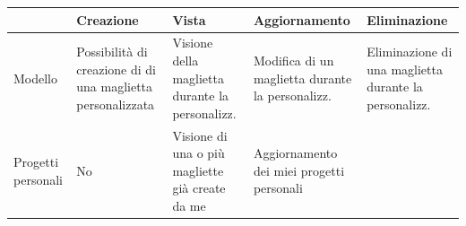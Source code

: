 \documentclass[12pt,italian,]{report}
\begin{document}
\begin{longtable}[]{|l|l|l|l|l|}
\toprule
\begin{minipage}[b]{0.17\columnwidth}\raggedright
\strut
\end{minipage} & \begin{minipage}[c]{0.17\columnwidth}\raggedright
Creazione\strut
\end{minipage} & \begin{minipage}[c]{0.17\columnwidth}\raggedright
Vista\strut
\end{minipage} & \begin{minipage}[c]{0.27\columnwidth}\raggedright
Aggiornamento\strut
\end{minipage} & \begin{minipage}[c]{0.17\columnwidth}\raggedright
Eliminazione\strut
\end{minipage}\tabularnewline
\midrule
\endhead
\begin{minipage}[t]{0.17\columnwidth}\raggedright
Modello\strut
\end{minipage} & \begin{minipage}[t]{0.17\columnwidth}\raggedright
Possibilità di creazione di di una maglietta personalizzata\strut
\end{minipage} & \begin{minipage}[t]{0.17\columnwidth}\raggedright
Visione della maglietta durante la personalizz.\strut
\end{minipage} & \begin{minipage}[t]{0.17\columnwidth}\raggedright
Modifica di un maglietta durante la personalizz.\strut
\end{minipage} & \begin{minipage}[t]{0.17\columnwidth}\raggedright
Eliminazione di una maglietta durante la personalizz.\strut
\end{minipage}\tabularnewline
\begin{minipage}[t]{0.17\columnwidth}\raggedright
Progetti personali\strut
\end{minipage} & \begin{minipage}[t]{0.17\columnwidth}\raggedright
No\strut
\end{minipage} & \begin{minipage}[t]{0.17\columnwidth}\raggedright
Visione di una o più magliette già create da me\strut
\end{minipage} & \begin{minipage}[t]{0.17\columnwidth}\raggedright
Aggiornamento dei miei progetti personali\strut
\end{minipage} & \begin{minipage}[t]{0.17\columnwidth}\raggedright

\end{minipage}
\end{longtable}
\end{document}
